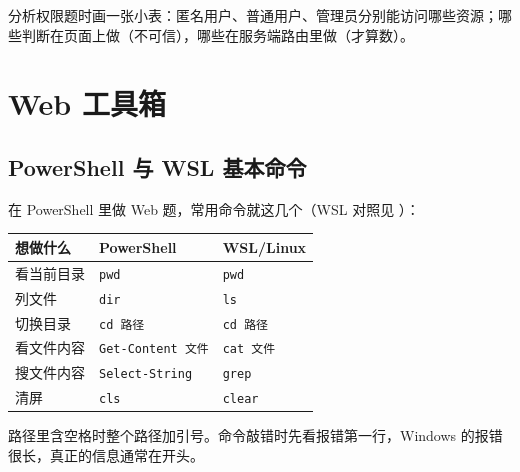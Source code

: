 \documentclass[UTF8,12pt,oneside]{ctexbook}
\begin{document}
分析权限题时画一张小表：匿名用户、普通用户、管理员分别能访问哪些资源；哪些判断在页面上做（不可信），哪些在服务端路由里做（才算数）。


\chapter{Web 工具箱}
\label{web:tools}

\section{PowerShell 与 WSL 基本命令}
在 PowerShell 里做 Web 题，常用命令就这几个（WSL 对照见 ）：
\begin{center}
\begin{tabular}{p{}p{}p{}}
\toprule
想做什么 & PowerShell & WSL/Linux \\
\midrule
看当前目录 & \verb|pwd| & \verb|pwd| \\
列文件 & \verb|dir| & \verb|ls| \\
切换目录 & \verb|cd 路径| & \verb|cd 路径| \\
看文件内容 & \verb|Get-Content 文件| & \verb|cat 文件| \\
搜文件内容 & \verb|Select-String| & \verb|grep| \\
清屏 & \verb|cls| & \verb|clear| \\
\bottomrule
\end{tabular}
\end{center}
路径里含空格时整个路径加引号。命令敲错时先看报错第一行，Windows 的报错很长，真正的信息通常在开头。
\end{document}
